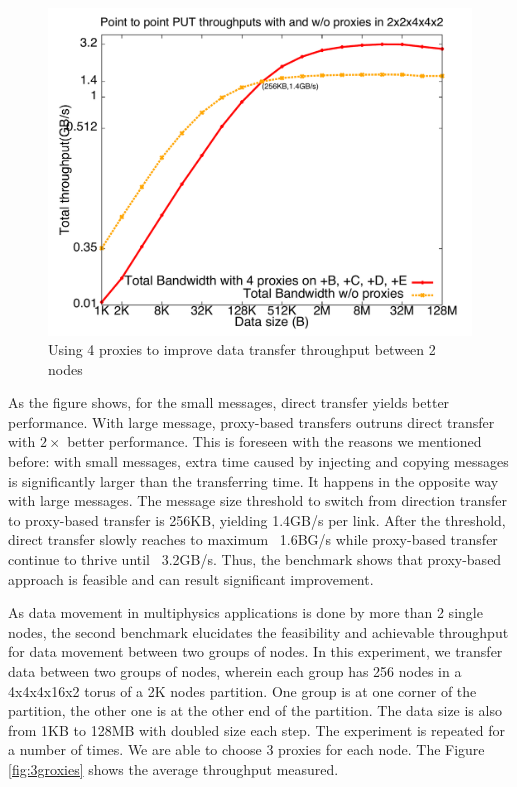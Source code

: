 \documentclass[final,5p,times]{elsarticle}
\begin{document}
\begin{figure}[!htb]
\vspace{-0.1in}
\centering
\includegraphics[scale=0.3]{figures/4proxies}
\vspace{-0.2in}
\caption{Using 4 proxies to improve data transfer throughput between 2 nodes}
\vspace{-0.1in}
\label{fig:4proxies}
\end{figure}

As the figure shows, for the small messages, direct transfer yields better performance. With large message, proxy-based transfers outruns direct transfer with $2\times$ better performance. This is foreseen with the reasons we mentioned before: with small messages, extra time caused by injecting and copying messages is significantly larger than the transferring time. It happens in the opposite way with large messages. The message size threshold to switch from direction transfer to proxy-based transfer is 256KB, yielding 1.4GB/s per link. After the threshold, direct transfer slowly reaches to maximum ~1.6BG/s while proxy-based transfer continue to thrive until ~3.2GB/s. Thus, the benchmark shows that proxy-based approach is feasible and can result significant improvement.

As data movement in multiphysics applications is done by more than 2 single nodes, the second benchmark elucidates the feasibility and achievable throughput for data movement between two groups of nodes. In this experiment, we transfer data between two groups of nodes, wherein each group has 256 nodes in a 4x4x4x16x2 torus of a 2K nodes partition. One group is at one corner of the partition, the other one is at the other end of the partition. The data size is also from 1KB to 128MB with doubled size each step. The experiment is repeated for a number of times. We are able to choose 3 proxies for each node. The Figure \ref{fig:3groxies} shows the average throughput measured.
\end{document}
